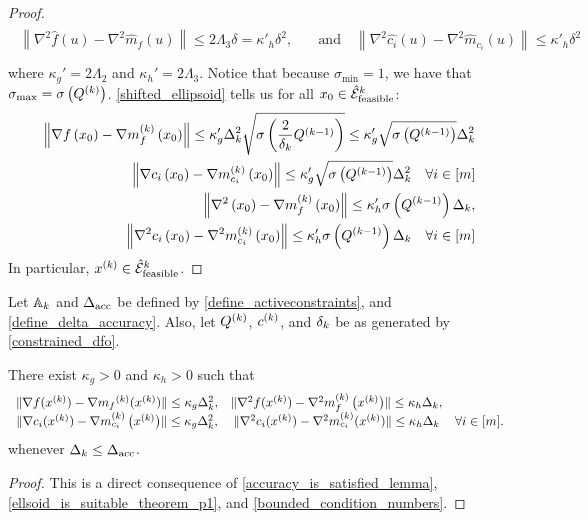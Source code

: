 \begin{proof}
\begin{align*}
\begin{array}{cc}
\left\|\nabla^2 \hat {f}\left(u\right) - \nabla^2 \hat{m}_f\left(u\right) \right\|\le 2\Lambda_3 \delta = {\kappa'}_h\delta^2, &
\quad \textrm{and} \quad \left\|\nabla^2 \hat {c_i}\left(u\right) - \nabla^2 \hat{m}_{c_i}\left(u\right) \right\|\le {\kappa'}_h\delta^2 \\
\end{array}
\end{align*}
where $\kappa_{g}' = 2 \Lambda_2$ and $\kappa_{h}' = 2\Lambda_3$.
Notice that because $\sigma_{\textrm{min}} = 1$, we have that ${\sigma_{\textrm{max}}} = {\sigma} \left({Q^{(k)}}\right)$.
\cref{shifted_ellipsoid} tells us for all $x_0 \in {{\mathcal {\hat E}_{\text{feasible}}}^k}$:
\begin{align*}
\left\|\nabla f\left(x_0 \right) - \nabla m^{(k)}_f\left(x_0\right)\right\| \le 
\kappa'_g  \Delta_k^2 \sqrt{{\sigma} \left(\frac 2 {\delta_k} {Q^{(k-1)}}\right)} \le \kappa'_g \sqrt{{\sigma} \left({Q^{(k-1)}}\right)}\Delta_k^2 \\
\left\|\nabla {c_i}\left(x_0 \right) - \nabla m^{(k)}_{c_i}\left(x_0\right)\right\| \le \kappa'_g\sqrt{{\sigma} \left({Q^{(k-1)}}\right)} \Delta_k^2 \quad \forall i \in [m] \\
\left\|\nabla^2\left(x_0 \right) - \nabla m^{(k)}_f\left(x_0\right)\right\| \le \kappa'_h {\sigma} \left({Q^{(k-1)}}\right)\Delta_k, \\
\left\|\nabla^2 {c_i}\left(x_0 \right) - \nabla^2 m^{(k)}_{c_i}\left(x_0\right)\right\| \le \kappa'_h {\sigma} \left({Q^{(k-1)}}\right)\Delta_k \quad \forall i \in [m]
\end{align*}
In particular, $x^{(k)} \in {{\mathcal {\hat E}_{\text{feasible}}}^k}$.
\end{proof}


\begin{theorem}
\label{accuracy_is_satisfied}
Let ${\mathbb A_{k}}$ and ${\Delta_{\textrm{acc}}}$ be defined by \cref{define_activeconstraints}, and \cref{define_delta_accuracy}.
Also, let ${Q^{(k)}}$, ${c^{(k)}}$, and $\delta_k$ 
be as generated by \cref{constrained_dfo}.



There exist $\kappa_g>0$ and $\kappa_h>0$ such that
\begin{align*}
\begin{array}{ccc}
\|\nabla f(x^{(k)}) - \nabla {{m}_f}^{(k)}(x^{(k)}) \| \le \kappa_g \Delta_k^2, & \|\nabla^2 f(x^{(k)}) - {\nabla^2m_f^{(k)}\left(x^{(k)}\right)} \| \le \kappa_h \Delta_k, & \\
\|\nabla c_i(x^{(k)}) - {\nabla m_{c_i}^{(k)}\left(x^{(k)}\right)} \| \le \kappa_g \Delta_k^2, & \|\nabla^2 c_i(x^{(k)}) - \nabla^2 m_{c_i}^{(k)}(x^{(k)}) \| \le \kappa_h \Delta_k & \forall i \in [m]. \\
\end{array}
\end{align*}
whenever $\Delta_k \le {\Delta_{\textrm{acc}}}$.
\end{theorem}
\begin{proof}
This is a direct consequence of \cref{accuracy_is_satisfied_lemma}, \cref{ellsoid_is_suitable_theorem_p1}, and \cref{bounded_condition_numbers}.
\end{proof}

